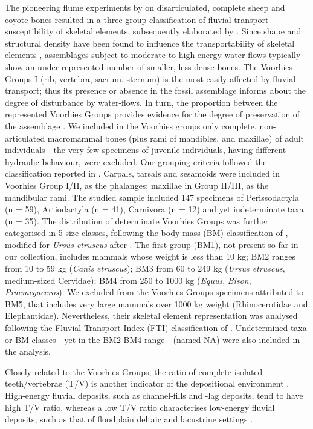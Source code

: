 \documentclass[review,times,authoryear]{elsarticle} %
\begin{document}
The pioneering flume experiments by \cite{Voorhies1969} on disarticulated, complete sheep and coyote bones resulted in a three-group classification of fluvial transport susceptibility of skeletal elements, subsequently elaborated by \cite{Behrensmeyer1975a}. Since shape and structural density have been found to influence the transportability of skeletal elements \citep{Behrensmeyer1975a,Boaz1982}, assemblages subject to moderate to high-energy water-flows typically show an under-represented number of smaller, less dense bones. The Voorhies Groups I (rib, vertebra, sacrum, sternum) is the most easily affected by fluvial transport; thus its presence or absence in the fossil assemblage informs about the degree of disturbance by water-flows. In turn, the proportion between the represented Voorhies Groups provides evidence for the degree of preservation of the assemblage \citep{Behrensmeyer1975a}. We included in the Voorhies groups only complete, non-articulated macromammal bones (plus rami of mandibles, and maxillae) of adult individuals - the very few specimens of juvenile individuals, having different hydraulic behaviour, were excluded. Our grouping criteria followed the classification reported in \citet[][Tab.6.5]{Lyman1994}. Carpals, tarsals and sesamoids were included in Voorhies Group I/II, as the phalanges; maxillae in Group II/III, as the mandibular rami. The studied sample included 147 specimens of Perissodactyla (n = 59), Artiodactyla (n = 41), Carnivora (n = 12) and yet indeterminate taxa (n = 35). The distribution of determinate Voorhies Groups was further categorised in 5 size classes, following the body mass (BM) classification of \cite{Palombo2010,Palombo2016}, modified for \emph{Ursus etruscus} after \cite{Koufos}. The first group (BM1), not present so far in our collection, includes mammals whose weight is less than 10 kg; BM2 ranges from 10 to 59 kg (\emph{Canis etruscus}); BM3 from 60 to 249 kg (\emph{Ursus etruscus}, medium-sized Cervidae); BM4 from 250 to 1000 kg (\emph{Equus}, \emph{Bison}, \emph{Praemegaceros}). We excluded from the Voorhies Groups specimens attributed to BM5, that includes very large mammals over 1000 kg weight (Rhinocerotidae and Elephantidae). Nevertheless, their skeletal element representation was analysed following the Fluvial Transport Index (FTI) classification of \cite{Frison1986}. Undetermined taxa or BM classes - yet in the BM2-BM4 range - (named NA) were also included in the analysis.

Closely related to the Voorhies Groups, the ratio of complete isolated teeth/vertebrae (T/V) is another indicator of the depositional environment \citep{Behrensmeyer1975a}. High-energy fluvial deposits, such as channel-fills and -lag deposits, tend to have high T/V ratio, whereas a low T/V ratio characterises low-energy fluvial deposits, such as that of floodplain deltaic and lacustrine settings \citep{Lyman1994}.
\end{document}
